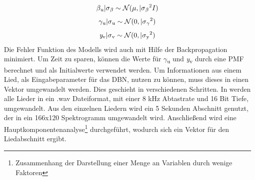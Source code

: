\documentclass[twosided,a4,10pt]{article}
\begin{document}
\begin{multicols}{2}
\begin{equation*}
		\centering
		\beta\textsubscript{u}|\sigma\textsubscript{$\beta$}\sim\mathcal{N}(\mu,|\sigma\textsubscript{$\beta$}\textsuperscript{2}I)
		\end{equation*}
		\begin{equation*}
		\centering
		\gamma\textsubscript{u}|\sigma\textsubscript{u}\sim\mathcal{N}(0,|\sigma\textsubscript{$\gamma$}\textsuperscript{2})
		\end{equation*}
		\begin{equation*}
		\centering
		\textit{y}\textsubscript{v}|\sigma\textsubscript{v}\sim\mathcal{N}(0,|\sigma\textsubscript{y}\textsuperscript{2})
		\end{equation*}\newline
		Die Fehler Funktion des Modells wird auch mit Hilfe der Backpropagation minimiert. Um Zeit zu sparen, können die Werte für $\gamma$\textsubscript{u} und \textit{y}\textsubscript{v} durch eine PMF berechnet und als Initialwerte verwendet werden. \cite{wang}\newline
		Um Informationen aus einem Lied, als Eingabeparameter für das DBN, nutzen zu können, muss dieses in einen Vektor umgewandelt werden. Dies geschieht in verschiedenen Schritten. In \cite{wang} werden alle Lieder in ein .wav Dateiformat, mit einer 8 kHz Abtastrate und 16 Bit Tiefe, umgewandelt. Aus den einzelnen Liedern wird ein 5 Sekunden Abschnitt genutzt, der in ein 166x120 Spektrogramm umgewandelt wird. Anschließend wird eine Hauptkomponentenanalyse\footnote[21]{Zusammenhang der Darstellung einer Menge an Variablen durch wenige Faktoren} durchgeführt, wodurch sich ein Vektor für den Liedabschnitt ergibt.

\end{multicols}
\end{document}
